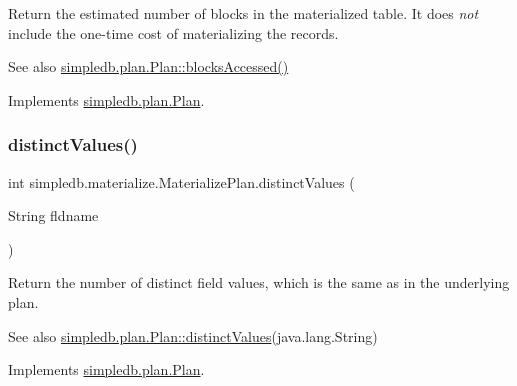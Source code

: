 Return the estimated number of blocks in the materialized table. It does {\itshape not} include the one-\/time cost of materializing the records. \begin{DoxySeeAlso}{See also}
\hyperlink{interfacesimpledb_1_1plan_1_1Plan_a6a333b95b956fe224812155b9d1c8202}{simpledb.\+plan.\+Plan\+::blocks\+Accessed()} 
\end{DoxySeeAlso}


Implements \hyperlink{interfacesimpledb_1_1plan_1_1Plan_a6a333b95b956fe224812155b9d1c8202}{simpledb.\+plan.\+Plan}.

\mbox{\label{classsimpledb_1_1materialize_1_1MaterializePlan_a98964c2c20961730b37e240e318b537d}} 
\subsubsection{\texorpdfstring{distinct\+Values()}{distinctValues()}}
{\footnotesize\ttfamily int simpledb.\+materialize.\+Materialize\+Plan.\+distinct\+Values (\begin{DoxyParamCaption}\item[{String}]{fldname }\end{DoxyParamCaption})\hspace{0.3cm}{\ttfamily [inline]}}

Return the number of distinct field values, which is the same as in the underlying plan. \begin{DoxySeeAlso}{See also}
\hyperlink{interfacesimpledb_1_1plan_1_1Plan_a55094c16c756b0c09b5c71b94d573271}{simpledb.\+plan.\+Plan\+::distinct\+Values}(java.\+lang.\+String) 
\end{DoxySeeAlso}


Implements \hyperlink{interfacesimpledb_1_1plan_1_1Plan_a55094c16c756b0c09b5c71b94d573271}{simpledb.\+plan.\+Plan}.

\mbox{\label{classsimpledb_1_1materialize_1_1MaterializePlan_acf693ce6e3b9e7603286ea4c971e1d51}} 

